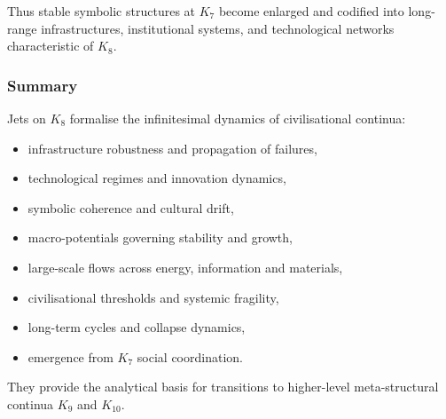 Thus stable symbolic structures at $K_7$ become enlarged and codified
into long-range infrastructures, institutional systems, and
technological networks characteristic of $K_8$.


\subsubsection{Summary}

Jets on $K_8$ formalise the infinitesimal dynamics of civilisational
continua:
\begin{itemize}
    \item infrastructure robustness and propagation of failures,
    \item technological regimes and innovation dynamics,
    \item symbolic coherence and cultural drift,
    \item macro-potentials governing stability and growth,
    \item large-scale flows across energy, information and materials,
    \item civilisational thresholds and systemic fragility,
    \item long-term cycles and collapse dynamics,
    \item emergence from $K_7$ social coordination.
\end{itemize}

They provide the analytical basis for transitions to higher-level
meta-structural continua $K_9$ and $K_{10}$.
